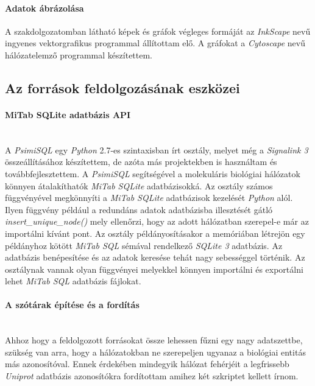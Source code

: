 \documentclass[a4paper,12pt]{article}
\begin{document}
			\paragraph{Adatok ábrázolása}
			A szakdolgozatomban látható képek és gráfok végleges formáját az \textit{InkScape} nevű ingyenes vektorgrafikus programmal állítottam elő. A gráfokat a \textit{Cytoscape} nevű hálózatelemző programmal készítettem.

		\subsection{Az források feldolgozásának eszközei}

			\paragraph{MiTab SQLite adatbázis API} \mbox{}\\
			A \textit{PsimiSQL} egy \textit{Python} 2.7-es szintaxisban írt osztály, melyet még a \textit{Signalink 3} összeállításához készítettem, de azóta más projektekben is használtam és továbbfejlesztettem. A \textit{PsimiSQL} segítségével a molekuláris biológiai hálózatok könnyen átalakíthatók \textit{MiTab SQLite} adatbázisokká. Az osztály számos függvényével megkönnyíti a \textit{MiTab SQLite} adatbázisok kezelését \textit{Python} alól. Ilyen függvény például a redundáns adatok adatbázisba illesztését gátló \textit{insert\_unique\_node()} mely ellenőrzi, hogy az adott hálózatban szerepel-e már az importálni kívánt pont. Az osztály példányosításakor a memóriában létrejön egy példányhoz kötött \textit{MiTab SQL} sémával rendelkező \textit{SQLite 3} adatbázis. Az adatbázis benépesítése és az adatok keresése tehát nagy sebességgel történik. Az osztálynak vannak olyan függvényei melyekkel könnyen importálni és exportálni lehet \textit{MiTab SQL} adatbázis fájlokat.

			\paragraph{A szótárak építése és a fordítás} \mbox{}\\
			Ahhoz hogy a feldolgozott forrásokat össze lehessen fűzni egy nagy adatszettbe, szükség van arra, hogy a hálózatokban ne szerepeljen ugyanaz a biológiai entitás más azonosítóval. Ennek érdekében mindegyik hálózat fehérjéit a legfrissebb \textit{Uniprot} adatbázis azonosítókra fordítottam amihez két szkriptet kellett írnom.
\end{document}
